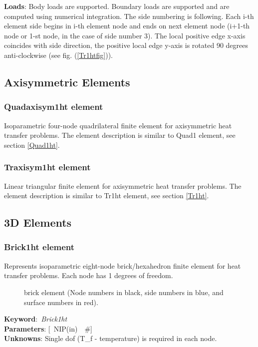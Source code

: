 \documentclass[12pt,dvips]{article}
\newcommand{\descitem}[1]{{\noindent \bf #1}:}
\newcommand{\elemkeyword}[1]{\descitem{Keyword}~{\em #1}}
\newcommand{\elemparam}[2]{{{#1\tiny (#2)}~~\#}}
\newcommand{\optelemparam}[2]{{[~\elemparam{#1}{#2}]}}
\begin{document}
\descitem{Loads} Body loads are supported. Boundary loads are
supported and are computed  using numerical integration. The side numbering is
following. Each i-th element side begins in i-th element node and
ends on next element node (i+1-th node or 1-st node, in the case of 
side number 3). The local positive edge x-axis coincides with side
direction, the positive local edge y-axis is rotated 90 degrees
anti-clockwise (see fig. (\ref{Tr1htfig})).



\subsection{Axisymmetric Elements}
\subsubsection{Quadaxisym1ht element}
Isoparametric four-node quadrilateral finite element for
axisymmetric heat transfer problems. The element description is
similar to Quad1 element, see section \ref{Quad1ht}.


\subsubsection{Traxisym1ht element}
Linear triangular finite element for axisymmetric heat transfer
problems. The element description is
similar to Tr1ht element, see section \ref{Tr1ht}.

\subsection{3D Elements}
\subsubsection{Brick1ht element}
\label{Brick1ht}
Represents isoparametric eight-node brick/hexahedron finite element for
heat transfer problems. Each node has 1 degrees of freedom.
\begin{figure}[tb]
\centerline{}
\caption{brick element (Node numbers in black, side numbers in blue,
and surface numbers in red).}
\label{Brick1htfig}
\end{figure}

\elemkeyword{Brick1ht}\\
\descitem{Parameters} \optelemparam{NIP}{in}\\
\descitem{Unknowns}
Single dof (T\_f - temperature) is required in each node.
\end{document}
